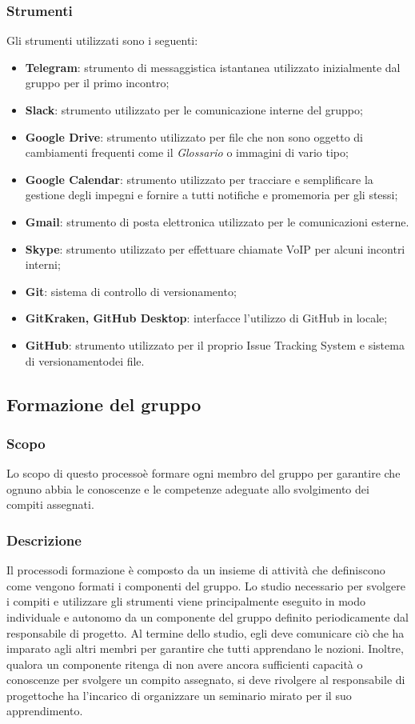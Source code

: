 		\subsubsection{Strumenti}
			Gli strumenti utilizzati sono i seguenti:
			\begin{itemize}
				\item \textbf{Telegram}\glo: strumento di messaggistica istantanea utilizzato inizialmente dal gruppo per il primo incontro;
				\item \textbf{Slack}\glo: strumento utilizzato per le comunicazione interne del gruppo;
				\item \textbf{Google Drive}: strumento utilizzato per file che non sono oggetto di cambiamenti frequenti come il \textit{Glossario} o immagini di vario tipo;
				\item \textbf{Google Calendar}: strumento utilizzato per tracciare e semplificare la gestione degli impegni e fornire a tutti notifiche e promemoria per gli stessi;
				\item \textbf{Gmail}: strumento di posta elettronica utilizzato per le comunicazioni esterne.
				\item \textbf{Skype}: strumento utilizzato per effettuare chiamate VoIP per alcuni incontri interni;
				\item \textbf{Git}: sistema di controllo di versionamento\glo;
				\item \textbf{GitKraken, GitHub Desktop}: interfacce l'utilizzo di GitHub in locale;
				\item \textbf{GitHub}: strumento utilizzato per il proprio Issue Tracking System e sistema di versionamento\glosp dei file.
			\end{itemize}
	\subsection{Formazione del gruppo}
		\subsubsection{Scopo}
			Lo scopo di questo processo\glosp è formare ogni membro del gruppo per garantire che ognuno abbia le conoscenze e le competenze adeguate allo svolgimento dei compiti assegnati.
		\subsubsection{Descrizione}
			Il processo\glosp di formazione è composto da un insieme di attività che definiscono come vengono formati i componenti del gruppo.
			Lo studio necessario per svolgere i compiti e utilizzare gli strumenti viene principalmente eseguito in modo individuale e autonomo da un componente del gruppo definito periodicamente dal responsabile di progetto\glo. Al termine dello studio, egli deve comunicare ciò che ha imparato agli altri membri per garantire che tutti apprendano le nozioni.
			Inoltre, qualora un componente ritenga di non avere ancora sufficienti capacità o conoscenze per svolgere un compito assegnato, si deve rivolgere al responsabile di progetto\glosp che ha l'incarico di organizzare un seminario mirato per il suo apprendimento.
			
